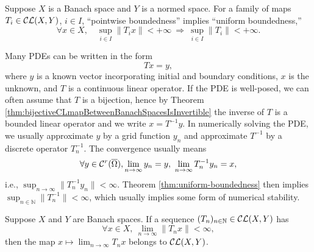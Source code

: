 \begin{thm}
  \label{thm:uniform-boundedness}
  Suppose $X$ is a Banach space and $Y$ is a normed space.
  For a family of maps $T_i\in {\cal CL}(X,Y)$, $i\in I$, 
  ``pointwise boundedness''
  implies ``uniform boundedness,'' %
  \begin{displaymath}
    \forall x\in X,\quad
    \sup_{i\in I} \|T_i x\| < +\infty
    \ \Rightarrow\ 
    \sup_{i\in I} \|T_i\| <+\infty.
  \end{displaymath}
\end{thm}

\begin{exm}
  Many PDEs can be written in the form
  \begin{displaymath}
    Tx = y,
  \end{displaymath}
  where $y$ is a known vector incorporating initial and boundary
  conditions,
  $x$ is the unknown, 
  and $T$ is a continuous linear operator.
  If the PDE is well-posed, we can often assume
  that $T$ is a bijection,
  hence by Theorem
  \ref{thm:bijectiveCLmapBetweenBanachSpacesIsInvertible}
  the inverse of $T$ is a bounded linear operator
  and we write $x=T^{-1}y$.
  In numerically solving the PDE,
  we usually approximate $y$ by a grid function $y_n$ 
  and approximate $T^{-1}$ by a discrete operator $T^{-1}_n$.
  The convergence usually means
  \begin{displaymath}
    \forall y\in {\cal C}^r(\overline{\Omega}),
    \lim_{n\rightarrow \infty} y_n = y,\ 
    \lim_{n\rightarrow \infty} T^{-1}_n y_n = x, 
  \end{displaymath}
  i.e., $\sup_{n\rightarrow \infty} \|T^{-1}_n y_n\|<\infty$.
  Theorem \ref{thm:uniform-boundedness} then implies
  $\sup_{n\in \mathbb{N}}\|T_n^{-1}\|<\infty$,
  which usually implies some form of numerical stability.
\end{exm}

\begin{thm}
  \label{thm:Banach-Steinhauss}
  Suppose $X$ and $Y$ are Banach spaces.
  If a sequence $(T_n)_{n\in \mathbb{N}}\in {\cal CL}(X,Y)$
  has
  \begin{displaymath}
    \forall x\in X, \
    \lim_{n\rightarrow \infty} \|T_n x\| < \infty, 
  \end{displaymath}
  then the map $x\mapsto \lim_{n\rightarrow \infty} T_n x$
  belongs to ${\cal CL}(X,Y)$.
\end{thm}


